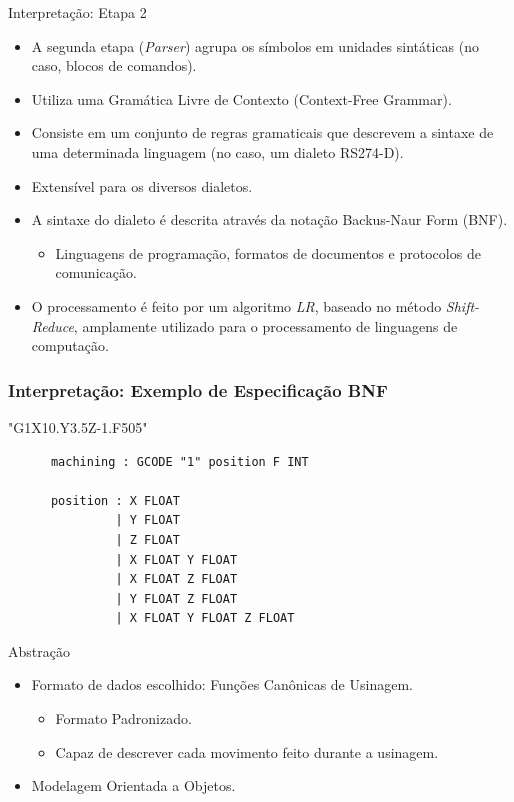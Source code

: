 \documentclass[aspectratio=169]{beamer}
\begin{document}
{\begin{frame}{Interpretação: Etapa 2}
  \begin{itemize}
    \item A segunda etapa (\emph{Parser}) agrupa os símbolos em unidades 
          sint\'aticas (no caso, blocos de comandos).
    \item Utiliza uma Gramática Livre de Contexto (Context-Free Grammar).
    \item Consiste em um conjunto de regras gramaticais que descrevem a 
          sintaxe de uma determinada linguagem (no caso, um dialeto RS274-D).
    \item Extensível para os diversos dialetos.
    \item A sintaxe do dialeto é descrita através da notação Backus-Naur 
          Form (BNF).
    \begin{itemize}
      \item Linguagens de programação, formatos de documentos e 
            protocolos de comunicação.
    \end{itemize}
    \item O processamento é feito por um algoritmo \emph{LR}, baseado no método 
          \emph{Shift-Reduce}, amplamente utilizado para o processamento 
          de linguagens de computação.
  \end{itemize}
\end{frame}


\begin{frame}[fragile]
  \frametitle{Interpretação: Exemplo de Especificação BNF}
  \begin{example}
   "G1X10.Y3.5Z-1.F505"
    \begin{lstlisting}
      machining : GCODE "1" position F INT

      position : X FLOAT
               | Y FLOAT
               | Z FLOAT
               | X FLOAT Y FLOAT
               | X FLOAT Z FLOAT
               | Y FLOAT Z FLOAT
               | X FLOAT Y FLOAT Z FLOAT
    \end{lstlisting}
  \end{example}  
\end{frame}


\begin{frame}{Abstração}
  \begin{itemize}
    \item Formato de dados escolhido: Funções Canônicas de Usinagem.
    \begin{itemize}
      \item Formato Padronizado.
      \item Capaz de descrever cada movimento feito durante a usinagem.
    \end{itemize}
    \item Modelagem Orientada a Objetos.
  \end{itemize}
\end{frame}


}
\end{document}
